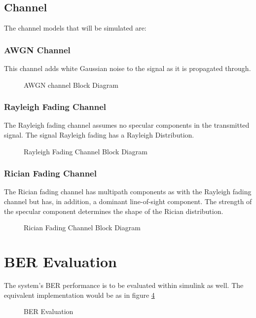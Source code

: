 \subsection{Channel}
The channel models that will be simulated are:
\subsubsection{\gls{AWGN} Channel}
This channel adds white Gaussian noise to the signal as it is propagated through. 
\begin{figure}[htpb!]
	\centerline{\resizebox{15cm}{!}{}}
	\caption{\gls{AWGN} channel Block Diagram}
	\label{fig:ofdm_ch_awgn_meth}
\end{figure}

\subsubsection{Rayleigh Fading Channel}
The Rayleigh fading channel assumes no specular components in the transmitted signal. The signal Rayleigh fading has a Rayleigh Distribution.
\begin{figure}[htpb!]
	\centerline{\resizebox{15cm}{!}{}}
	\caption{Rayleigh Fading Channel Block Diagram}
	\label{fig:ofdm_ch_rayl_meth}
\end{figure}

\subsubsection{Rician Fading Channel}
The Rician fading channel has multipath components as with the Rayleigh fading channel but has, in addition, a dominant line-of-sight component. The strength of the specular component determines the shape of the Rician distribution. 
\begin{figure}[h!]
	\centerline{\resizebox{15cm}{!}{}}
	\caption{Rician Fading Channel Block Diagram}
	\label{fig:ofdm_ch_rice_meth}
\end{figure}

\section{\gls{BER} Evaluation}
The system's \gls{BER} performance is to be evaluated within \gls{simulink} as well. The equivalent implementation would be as in figure \ref{fig:ber_blk_meth}
\begin{figure}[htpb!]
	\centerline{\resizebox{15cm}{!}{}}
	\caption{\gls{BER} Evaluation}
	\label{fig:ber_blk_meth}
\end{figure}

